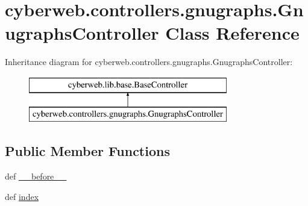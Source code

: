 \hypertarget{classcyberweb_1_1controllers_1_1gnugraphs_1_1_gnugraphs_controller}{\section{cyberweb.\-controllers.\-gnugraphs.\-Gnugraphs\-Controller \-Class \-Reference}
\label{classcyberweb_1_1controllers_1_1gnugraphs_1_1_gnugraphs_controller}
}
\-Inheritance diagram for cyberweb.\-controllers.\-gnugraphs.\-Gnugraphs\-Controller\-:\begin{figure}[H]
\begin{center}
\leavevmode
\includegraphics[height=2.000000cm]{classcyberweb_1_1controllers_1_1gnugraphs_1_1_gnugraphs_controller}
\end{center}
\end{figure}
\subsection*{\-Public \-Member \-Functions}
\begin{DoxyCompactItemize}
\item 
def \hyperlink{classcyberweb_1_1controllers_1_1gnugraphs_1_1_gnugraphs_controller_a2203a9cab4e0bdb7cc0b3277cb4df8a0}{\-\_\-\-\_\-before\-\_\-\-\_\-}
\item 
def \hyperlink{classcyberweb_1_1controllers_1_1gnugraphs_1_1_gnugraphs_controller_a0ae309a0fdf0cfe01b185daec896d675}{index}
\end{DoxyCompactItemize}


